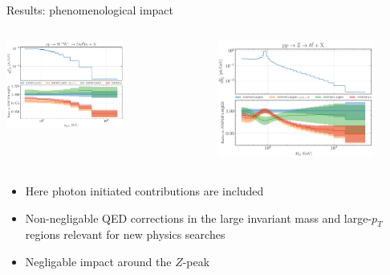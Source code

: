 \documentclass[aspectratio=169, 8pt,t]{beamer}
\begin{document}
\begin{frame}{Results: phenomenological impact}
  \begin{columns}[T]
    \begin{column}{0.59\textwidth}
      \includegraphics[width=0.6\textwidth]{figures/NNPDF_WPWM_14TEV_40_PHENO-internal.pdf}
    \end{column}
    \begin{column}{0.39\textwidth}
      \vspace*{-3.5em}
      \includegraphics[width=0.8\textwidth]{figures/NNPDF_DY_14TEV_40_PHENO-internal.pdf}
    \end{column}
  \end{columns}
  \begin{columns}[T]
    \begin{column}{0.59\textwidth}
      \vspace*{1em}
      \begin{itemize}
        \item Here photon initiated contributions are included
        \item Non-negligable QED corrections in the large invariant mass and large-$p_T$ regions relevant for new physics searches
        \item Negligable impact around the $Z$-peak

\end{itemize}
\end{column}
\end{columns}
\end{frame}
\end{document}
